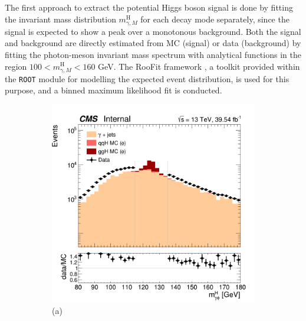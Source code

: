 The first approach to extract the potential Higgs boson signal is done by fitting the invariant mass distribution $m^{\text{H}}_{\gamma, M}$ for each decay mode separately, since the signal is expected to show a peak over a monotonous background. Both the signal and background are directly estimated from MC (signal) or data (background) by fitting the photon-meson invariant mass spectrum with analytical functions in the region $100 < m^{\text{H}}_{\gamma, M} < 160$ GeV. The RooFit framework \cite{CERN:root_roofit}, a toolkit provided within the \verb+ROOT+ module for modelling the expected event distribution, is used for this purpose, and a binned maximum likelihood fit is conducted.

\begin{figure}[!ht]
    \captionsetup[subfigure]{labelformat=empty}
    \vspace*{-0.2cm}
    \centering
    \setlength{\mylength}{\textwidth}
    \begin{subfigure}[t]{0.50\mylength}
        \centering
        \includegraphics[width=0.49\mylength]{resources/plots/Phi3_HiggsMass.png}
        \vspace*{-0.2cm}
        \caption{\footnotesize (a)}
    \end{subfigure}%
    \begin{subfigure}[t]{0.50\mylength}
        \centering

\end{subfigure}
\end{figure}

